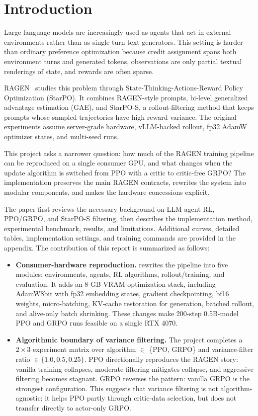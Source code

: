 \section{Introduction}
\label{sec:introduction}

Large language models are increasingly used as agents that act in external environments rather than as single-turn text generators. This setting is harder than ordinary preference optimization because credit assignment spans both environment turns and generated tokens, observations are only partial textual renderings of state, and rewards are often sparse.

RAGEN~\citep{wang2025ragen} studies this problem through State-Thinking-Actions-Reward Policy Optimization (StarPO). It combines RAGEN-style prompts, bi-level generalized advantage estimation (GAE), and StarPO-S, a rollout-filtering method that keeps prompts whose sampled trajectories have high reward variance. The original experiments assume server-grade hardware, vLLM-backed rollout, fp32 AdamW optimizer states, and multi-seed runs.

This project asks a narrower question: how much of the RAGEN training pipeline can be reproduced on a single consumer GPU, and what changes when the update algorithm is switched from PPO with a critic to critic-free GRPO? The implementation preserves the main RAGEN contracts, rewrites the system into modular components, and makes the hardware concessions explicit.

The paper first reviews the necessary background on LLM-agent RL, PPO/GRPO, and StarPO-S filtering, then describes the implementation method, experimental benchmark, results, and limitations. Additional curves, detailed tables, implementation settings, and training commands are provided in the appendix. The contribution of this report is summarized as follows:

\begin{itemize}[leftmargin=*]
    \item \textbf{Consumer-hardware reproduction.} \method{} rewrites the pipeline into five modules: environments, agents, RL algorithms, rollout/training, and evaluation. It adds an 8 GB VRAM optimization stack, including AdamW8bit with fp32 embedding states, gradient checkpointing, bf16 weights, micro-batching, KV-cache restoration for generation, batched rollout, and alive-only batch shrinking. These changes make 200-step 0.5B-model PPO and GRPO runs feasible on a single RTX 4070.
    \item \textbf{Algorithmic boundary of variance filtering.} The project completes a \(2 \times 3\) experiment matrix over algorithm \(\in\) \{PPO, GRPO\} and variance-filter ratio \(\in \{1.0, 0.5, 0.25\}\). PPO directionally reproduces the RAGEN story: vanilla training collapses, moderate filtering mitigates collapse, and aggressive filtering becomes stagnant. GRPO reverses the pattern: vanilla GRPO is the strongest configuration. This suggests that variance filtering is not algorithm-agnostic; it helps PPO partly through critic-data selection, but does not transfer directly to actor-only GRPO.
\end{itemize}
